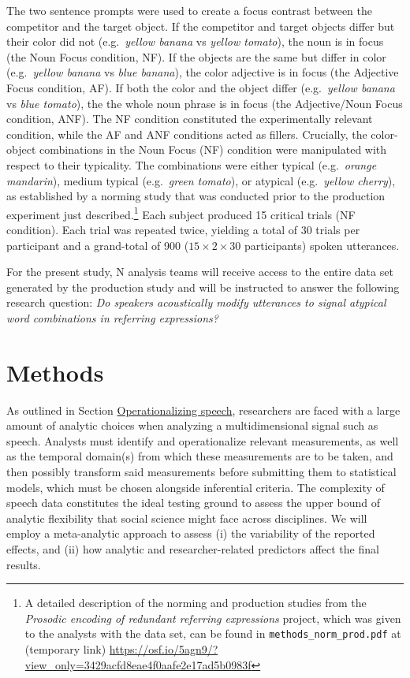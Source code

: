 \documentclass[Review,times,sageh]{sagej}
\begin{document}
The two sentence prompts were used to create a focus contrast between the competitor and the target object.
If the competitor and target objects differ but their color did not (e.g.~\emph{yellow banana} vs \emph{yellow tomato}), the noun is in focus (the Noun Focus condition, NF).
If the objects are the same but differ in color (e.g.~\emph{yellow banana} vs \emph{blue banana}), the color adjective is in focus (the Adjective Focus condition, AF).
If both the color and the object differ (e.g.~\emph{yellow banana} vs \emph{blue tomato}), the the whole noun phrase is in focus (the Adjective/Noun Focus condition, ANF).
The NF condition constituted the experimentally relevant condition, while the AF and ANF conditions acted as fillers.
Crucially, the color-object combinations in the Noun Focus (NF) condition were manipulated with respect to their typicality.
The combinations were either typical (e.g.~\emph{orange mandarin}), medium typical (e.g.~\emph{green tomato}), or atypical (e.g.~\emph{yellow cherry}), as established by a norming study that was conducted prior to the production experiment just described.\footnote{A detailed description of the norming and production studies from the \emph{Prosodic encoding of redundant referring expressions} project, which was given to the analysts with the data set, can be found in \texttt{methods\_norm\_prod.pdf} at (temporary link) \url{https://osf.io/5agn9/?view_only=3429acfd8eae4f0aafe2e17ad5b0983f}}
Each subject produced 15 critical trials (NF condition).
Each trial was repeated twice, yielding a total of 30 trials per participant and a grand-total of 900 (\(15 \times 2 \times 30\) participants) spoken utterances.

For the present study, N analysis teams will receive access to the entire data set generated by the production study and will be instructed to answer the following research question: \emph{Do speakers acoustically modify utterances to signal atypical word combinations in referring expressions?}

\hypertarget{methods}{%
\section{Methods}\label{methods}}

As outlined in Section \protect\hyperlink{s:operspeech}{Operationalizing speech}, researchers are faced with a large amount of analytic choices when analyzing a multidimensional signal such as speech.
Analysts must identify and operationalize relevant measurements, as well as the temporal domain(s) from which these measurements are to be taken, and then possibly transform said measurements before submitting them to statistical models, which must be chosen alongside inferential criteria.
The complexity of speech data constitutes the ideal testing ground to assess the upper bound of analytic flexibility that social science might face across disciplines.
We will employ a meta-analytic approach to assess (i) the variability of the reported effects, and (ii) how analytic and researcher-related predictors affect the final results.
\end{document}
